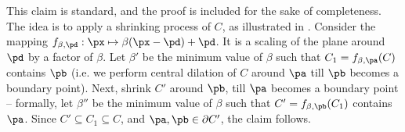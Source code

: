     This claim is standard, and the proof is included for the sake of
        completeness.  The idea is to apply a shrinking process of $C$, as
        illustrated in .  Consider the mapping
        $f_{\beta, \pd} : \px \mapsto \beta (\px - \pd) + \pd $. It is a
        scaling of the plane around $\pd$ by a factor of $\beta$. Let
        $\beta'$ be the minimum value of $\beta$ such that
        $C_1 = f_{\beta,\pa}(C)$ contains $\pb$ (i.e. we perform central
        dilation of $C$ around $\pa$ till $\pb$ becomes a boundary
        point). Next, shrink $C'$ around $\pb$, till $\pa$ becomes a
        boundary point -- formally, let $\beta''$ be the minimum value of
        $\beta$ such that $C' = f_{\beta,\pb}(C_1)$ contains $\pa$. Since
        $C' \subseteq C_1 \subseteq C$, and $\pa, \pb \in \partial C'$,
        the claim follows.

